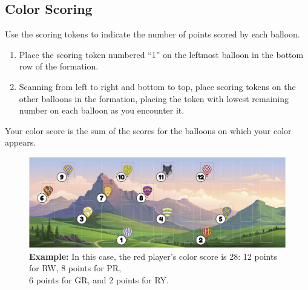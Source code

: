 \documentclass[a6paper, 11pt, parskip=half, DIV=15]{scrartcl}
\begin{document}
\subsection*{Color Scoring}
Use the scoring tokens to indicate the number of points scored by each balloon.
\begin{enumerate}
  \item Place the scoring token numbered ``1'' on the leftmost balloon in the bottom row of the formation.
  \item Scanning from left to right and bottom to top, place scoring tokens on the other balloons in the formation, placing the token with lowest remaining number on each balloon as you encounter it.
\end{enumerate}


Your color score is the sum of the scores for the balloons on which your color appears.

\vfill

\begin{figure}[hb]
\centering
\includegraphics[scale=0.115]{Images/scoring_diagram.png}
\caption*{\textbf{Example:} In this case, the red player's color score is 28: 12 points for {\setmainfont{Playball}RW}, 8 points for {\setmainfont{Playball}PR},\\6 points for {\setmainfont{Playball}GR}, and 2 points for {\setmainfont{Playball}RY}.}
\end{figure}

\newpage
\enlargethispage{1.75\baselineskip}
\end{document}
